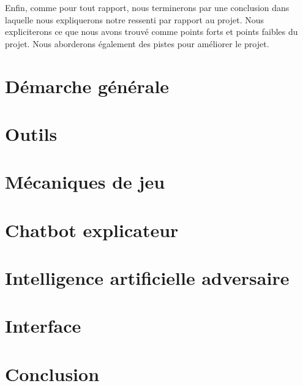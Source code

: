 \documentclass[a4paper, 11pt]{article}
\begin{document}
Enfin, comme pour tout rapport, nous terminerons par une conclusion dans laquelle nous expliquerons notre ressenti par rapport au projet. Nous expliciterons ce que nous avons trouvé comme points forts et points faibles du projet. Nous aborderons également des pistes pour améliorer le projet.

\newpage

\section{Démarche générale}

\newpage

\section{Outils}

\newpage

\section{Mécaniques de jeu}

\newpage

\section{Chatbot explicateur}

\newpage

\section{Intelligence artificielle adversaire}

\newpage

\section{Interface}

\newpage

\section{Conclusion}
\end{document}
